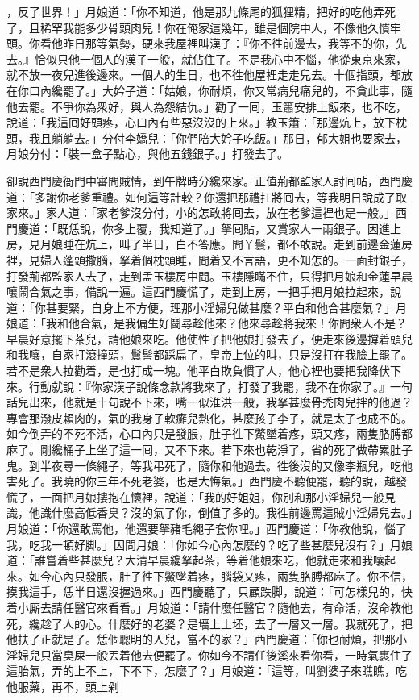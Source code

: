 ，反了世界！」月娘道：「你不知道，他是那九條尾的狐狸精，把好的吃他弄死了，且稀罕我能多少骨頭肉兒！你在俺家這幾年，雖是個院中人，不像他久慣牢頭。你看他昨日那等氣勢，硬來我屋裡叫漢子：『你不徃前邊去，我等不的你，先去。』恰似只他一個人的漢子一般，就佔住了。不是我心中不惱，他從東京來家，就不放一夜兒進後邊來。一個人的生日，也不徃他屋裡走走兒去。十個指頭，都放在你口內纔罷了。」{}大妗子道：「姑娘，你耐煩，你又常病兒痛兒的，不貪此事，隨他去罷。不爭你為衆好，與人為怨結仇。」勸了一囘，玉簫安排上飯來，也不吃，說道：「我這囘好頭疼，心口內有些惡沒沒的上來。」教玉簫：「那邊炕上，放下枕頭，我且躺躺去。」分付李嬌兒：「你們陪大妗子吃飯。」那日，郁大姐也要家去，月娘分付：「裝一盒子點心，與他五錢銀子。」打發去了。

卻說西門慶衙門中審問賊情，到午牌時分纔來家。正值荊都監家人討囘帖，西門慶道：「多謝你老爹重禮。如何這等計較？你還把那禮扛將囘去，等我明日說成了取家來。」家人道：「家老爹沒分付，小的怎敢將囘去，放在老爹這裡也是一般。」西門慶道：「既恁說，你多上覆，我知道了。」拏囘貼，又賞家人一兩銀子。因進上房，見月娘睡在炕上，叫了半日，白不答應。問丫鬟，都不敢說。走到前邊金蓮房裡，見婦人蓬頭撒腦，拏着個枕頭睡，問着又不言語，更不知怎的。一面封銀子，打發荊都監家人去了，走到孟玉樓房中問。玉樓隱瞞不住，只得把月娘和金蓮早晨嚷鬧合氣之事，備說一遍。這西門慶慌了，走到上房，一把手把月娘拉起來，說道：「你甚要緊，自身上不方便，理那小淫婦兒做甚麼？平白和他合甚麼氣？」月娘道：「我和他合氣，是我偏生好鬪尋趁他來？他來尋趁將我來！你問衆人不是？早晨好意擺下茶兒，請他娘來吃。他使性子把他娘打發去了，便走來後邊撐着頭兒和我嚷，自家打滾撞頭，鬟髻都踩扁了，皇帝上位的叫，只是沒打在我臉上罷了。若不是衆人拉勸着，是也打成一塊。他平白欺負慣了人，他心裡也要把我降伏下來。行動就說：『你家漢子說條念款將我來了，打發了我罷，我不在你家了。』一句話兒出來，他就是十句說不下來，嘴一似淮洪一般，我拏甚麼骨禿肉兒拌的他過？專會那潑皮賴肉的，氣的我身子軟癱兒熱化，甚麼孩子李子，就是太子也成不的。如今倒弄的不死不活，心口內只是發脹，肚子徃下鱉墜着疼，頭又疼，兩隻胳膊都麻了。剛纔桶子上坐了這一囘，又不下來。若下來也乾淨了，省的死了做帶累肚子鬼。到半夜尋一條繩子，等我弔死了，隨你和他過去。徃後沒的又像李瓶兒，吃他害死了。{}我曉的你三年不死老婆，也是大悔氣。」西門慶不聽便罷，聽的說，越發慌了，一面把月娘摟抱在懷裡，說道：「我的好姐姐，你別和那小淫婦兒一般見識，他識什麼高低香臭？沒的氣了你，倒值了多的。我徃前邊罵這賊小淫婦兒去。」月娘道：「你還敢罵他，他還要拏豬毛繩子套你哩。」西門慶道：「你教他說，惱了我，吃我一頓好脚。」因問月娘：「你如今心內怎麼的？吃了些甚麼兒沒有？」月娘道：「誰嘗着些甚麼兒？大清早晨纔拏起茶，等着他娘來吃，他就走來和我嚷起來。如今心內只發脹，肚子徃下鱉墜着疼，腦袋又疼，兩隻胳膊都麻了。你不信，摸我這手，恁半日還沒握過來。」西門慶聽了，只顧跌脚，說道：「可怎樣兒的，快着小厮去請任醫官來看看。」月娘道：「請什麼任醫官？隨他去，有命活，沒命教他死，纔趁了人的心。什麼好的老婆？是墻上土坯，去了一層又一層。我就死了，把他扶了正就是了。恁個聰明的人兒，當不的家？」西門慶道：「你也耐煩，把那小淫婦兒只當臭屎一般丟着他去便罷了。你如今不請任後溪來看你看，一時氣裹住了這胎氣，弄的上不上，下不下，怎麼了？」月娘道：「這等，叫劉婆子來瞧瞧，吃他服藥，再不，頭上剁